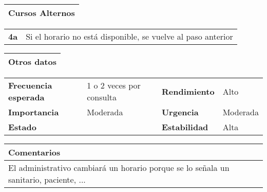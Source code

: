 \documentclass[11pt,a4paper]{article}
\begin{document}
\begin{table}[H]
	\begin{tabularx}{\textwidth}{X}
		\textbf{Cursos Alternos}\\ \hline
	\end{tabularx}
	\begin{tabularx}{\textwidth}{cX}
		\textbf{4a} & Si el horario no está disponible, se vuelve al paso anterior\\
	\end{tabularx}
\end{table}

\begin{table}[H]
	\begin{tabularx}{\textwidth}{X}
		\textbf{Otros datos}\\ \hline
	\end{tabularx}
	\begin{tabularx}{\textwidth}{lXlX}
		\textbf{Frecuencia esperada} & 1 o 2 veces por consulta & \textbf{Rendimiento} & Alto\\
		\textbf{Importancia} & Moderada & \textbf{Urgencia} & Moderada\\
		\textbf{Estado} &  & \textbf{Estabilidad} & Alta\\
	\end{tabularx}
	
	\begin{tabularx}{\textwidth}{X}
		\textbf{Comentarios}\\ \hline
		El administrativo cambiará un horario porque se lo señala un sanitario, paciente, ...
	\end{tabularx}
\end{table}

\end{document}
